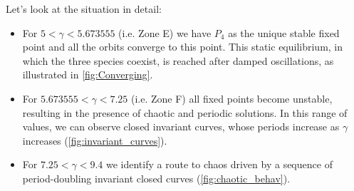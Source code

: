 \documentclass[10pt]{Configuration_Files/PoliMi3i_thesis}
\begin{document}
Let's look at the situation in detail:
\begin{itemize}
\item For $5 < \gamma < 5.673555$ (i.e. Zone E) we have $P_4$ as the unique stable fixed point and all the orbits converge to this point. This static equilibrium, in which the three species coexist, is reached after damped oscillations, as illustrated in \autoref{fig:Converging}.
\item For $5.673555 < \gamma < 7.25$ (i.e. Zone F) all fixed points become unstable, resulting in the presence of chaotic and periodic solutions. In this range of values, we can observe closed invariant curves, whose periods increase as $\gamma$ increases (\autoref{fig:invariant_curves}).
\item For $7.25 < \gamma < 9.4$  we identify a route to chaos driven by a sequence of period-doubling invariant closed curves (\autoref{fig:chaotic_behav}).
\end{itemize}
\end{document}
